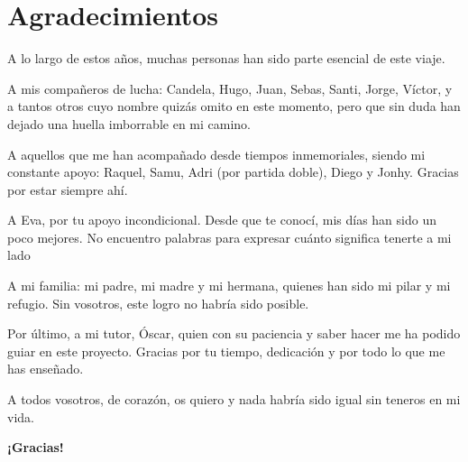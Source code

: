 \chapter*{Agradecimientos}

A lo largo de estos años, muchas personas han sido parte esencial de este viaje.

A mis compañeros de lucha: Candela, Hugo, Juan, Sebas, Santi, Jorge, Víctor, y a tantos otros cuyo nombre quizás omito en este momento, pero que sin duda han dejado una huella imborrable en mi camino.

A aquellos que me han acompañado desde tiempos inmemoriales, siendo mi constante apoyo: Raquel, Samu, Adri (por partida doble), Diego y Jonhy. Gracias por estar siempre ahí.

A Eva, por tu apoyo incondicional. Desde que te conocí, mis días han sido un poco mejores. No encuentro palabras para expresar cuánto significa tenerte a mi lado

A mi familia: mi padre, mi madre y mi hermana, quienes han sido mi pilar y mi refugio. Sin vosotros, este logro no habría sido posible.

Por último, a mi tutor, Óscar, quien con su paciencia y saber hacer me ha podido guiar en este proyecto. Gracias por tu tiempo, dedicación y por todo lo que me has enseñado.

A todos vosotros, de corazón, os quiero y nada habría sido igual sin teneros en mi vida.

\begin{center}
\vspace{2cm}
\Huge{\textbf{¡Gracias!}}
\end{center}
